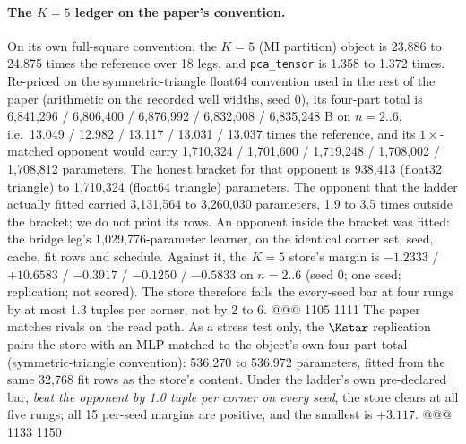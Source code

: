 \paragraph{The $K=5$ ledger on the paper's convention.} On its own full-square convention, the
$K=5$ (MI partition) object is 23.886 to 24.875 times the reference over 18 legs, and
\texttt{pca\_tensor} is 1.358 to 1.372 times. %
Re-priced on the symmetric-triangle float64 convention used in the rest of the paper (arithmetic
on the recorded well widths, seed 0), its four-part total is 6,841,296 / 6,806,400 / 6,876,992 / 6,832,008
/ 6,835,248 B on $n=2..6$, i.e.\ 13.049 / 12.982 / 13.117 / 13.031 / 13.037 times the reference, and its
$1\times$-matched opponent would carry 1,710,324 / 1,701,600 / 1,719,248 / 1,708,002 / 1,708,812
parameters. %
The honest bracket for that opponent is 938,413 (float32 triangle) to 1,710,324 (float64
triangle) parameters. The opponent that the ladder actually fitted carried 3,131,564 to 3,260,030
parameters, 1.9 to 3.5 times outside the bracket; we do not print its rows.
An opponent inside the bracket was fitted: the bridge leg's 1,029,776-parameter learner, on the
identical corner set, seed, cache, fit rows and schedule. Against it, the $K=5$ store's margin is
$-1.2333$ / $+10.6583$ / $-0.3917$ / $-0.1250$ / $-0.5833$ on $n=2..6$ (seed 0; one seed;
replication; not scored). The store therefore fails the every-seed bar at four rungs by at most
1.3 tuples per corner, not by 2 to 6. %
@@@ 1105 1111
The paper matches rivals on the read path. As a stress test only, the $\Kstar$ replication pairs
the store with an MLP matched to the object's own four-part total (symmetric-triangle
convention): 536,270 to 536,972 parameters, fitted from the same 32,768 fit rows as the store's
content. %
Under the ladder's own pre-declared bar, \emph{beat the opponent by 1.0 tuple per corner on every
seed}, the store clears at all five rungs; all 15 per-seed margins are positive, and the smallest
is $+3.117$. %
@@@ 1133 1150
